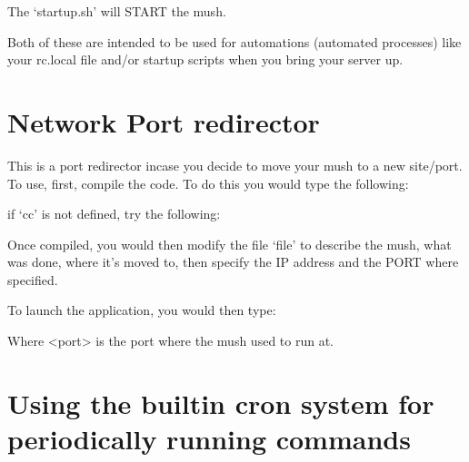 \documentclass[letterpaper,10pt,english]{sphinxmanual}
\begin{document}
\sphinxAtStartPar
The ‘startup.sh’ will START the mush.

\sphinxAtStartPar
Both of these are intended to be used for automations (automated processes)
like your rc.local file and/or startup scripts when you bring your server up.


\section{Network Port redirector}
\label{\detokenize{maintenance:network-port-redirector}}
\sphinxAtStartPar
This is a port redirector incase you decide to move your mush
to a new site/port.  To use, first, compile the code.  To do
this you would type the following:

\begin{sphinxVerbatim}[commandchars=\\\{\}]
   
\end{sphinxVerbatim}

\sphinxAtStartPar
if ‘cc’ is not defined, try the following:

\begin{sphinxVerbatim}[commandchars=\\\{\}]
   
\end{sphinxVerbatim}

\sphinxAtStartPar
Once compiled, you would then modify the file ‘file’ to describe
the mush, what was done, where it’s moved to, then specify the
IP address and the PORT where specified.

\sphinxAtStartPar
To launch the application, you would then type:

\begin{sphinxVerbatim}[commandchars=\\\{\}]
  
\end{sphinxVerbatim}

\sphinxAtStartPar
Where \textless{}port\textgreater{} is the port where the mush used to run at.


\section{Using the built\sphinxhyphen{}in cron system for periodically running commands}
\label{\detokenize{maintenance:using-the-built-in-cron-system-for-periodically-running-commands}}
\end{document}
